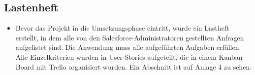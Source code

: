 

\subsection{Lastenheft}
\label{sec:Lastenheft}
\begin{itemize}
\item Bevor das Projekt in die Umsetzungsphase eintritt, wurde ein Lastheft erstellt, in dem alle von den Salesforce-Administratoren gestellten Anfragen aufgelistet sind. Die Anwendung muss alle aufgef\"uhrten Aufgaben erf\"ullen.
Alle Einzelkriterien wurden in User Stories aufgeteilt, die in einem Kanban-Board mit Trello organisiert wurden. Ein Abschnitt ist auf Anlage 4 zu sehen.
\end{itemize}

